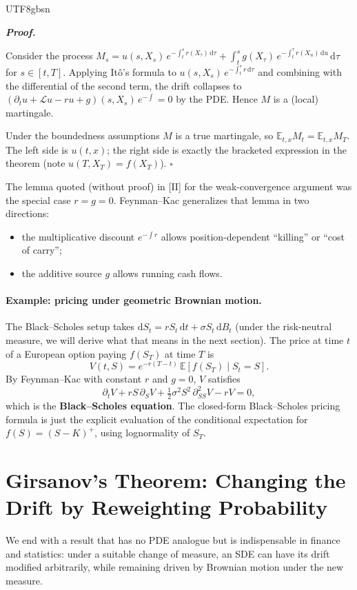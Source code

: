 \documentclass{article}
\newenvironment{proof}[1][Proof]{%
  \par\smallskip\noindent\textit{\textbf{#1.}}\quad\ignorespaces
}{%
  \hfill$\square$\par\smallskip
}
\begin{document}
\begin{CJK*}{UTF8}{gbsn}
\begin{proof}
Consider the process $M_s=u(s,X_s)\,e^{-\int_t^s r(X_\tau)\,\mathrm{d}\tau}+\int_t^s g(X_\tau)\,e^{-\int_t^\tau r(X_u)\,\mathrm{d}u}\,\mathrm{d}\tau$ for $s\in[t,T]$. Applying It\^o's formula to $u(s,X_s)\,e^{-\int_t^s r\,\mathrm{d}\tau}$ and combining with the differential of the second term, the drift collapses to $(\partial_t u+\mathcal{L}u-ru+g)(s,X_s)\,e^{-\int}=0$ by the PDE. Hence $M$ is a (local) martingale.

Under the boundedness assumptions $M$ is a true martingale, so $\mathbb{E}_{t,x}M_t=\mathbb{E}_{t,x}M_T$. The left side is $u(t,x)$; the right side is exactly the bracketed expression in the theorem (note $u(T,X_T)=f(X_T)$).
\end{proof}

The lemma quoted (without proof) in [II] for the weak-convergence argument was the special case $r=g=0$. Feynman--Kac generalizes that lemma in two directions:
\begin{itemize}
    \item the multiplicative discount $e^{-\int r}$ allows position-dependent ``killing'' or ``cost of carry'';
    \item the additive source $g$ allows running cash flows.
\end{itemize}

\paragraph{Example: pricing under geometric Brownian motion.}
The Black--Scholes setup takes $\mathrm{d}S_t=rS_t\,\mathrm{d}t+\sigma S_t\,\mathrm{d}B_t$ (under the risk-neutral measure, we will derive what that means in the next section). The price at time $t$ of a European option paying $f(S_T)$ at time $T$ is
\[
  V(t,S)=e^{-r(T-t)}\,\mathbb{E}[f(S_T)\mid S_t=S].
\]
By Feynman--Kac with constant $r$ and $g=0$, $V$ satisfies
\[
  \partial_t V+rS\,\partial_S V+\tfrac{1}{2}\sigma^2 S^2\,\partial_{SS}^2 V-rV=0,
\]
which is the \textbf{Black--Scholes equation}. The closed-form Black--Scholes pricing formula is just the explicit evaluation of the conditional expectation for $f(S)=(S-K)^+$, using lognormality of $S_T$.

\section{Girsanov's Theorem: Changing the Drift by Reweighting Probability}

We end with a result that has no PDE analogue but is indispensable in finance and statistics: under a suitable change of measure, an SDE can have its drift modified arbitrarily, while remaining driven by Brownian motion under the new measure.


\end{CJK*}
\end{document}
